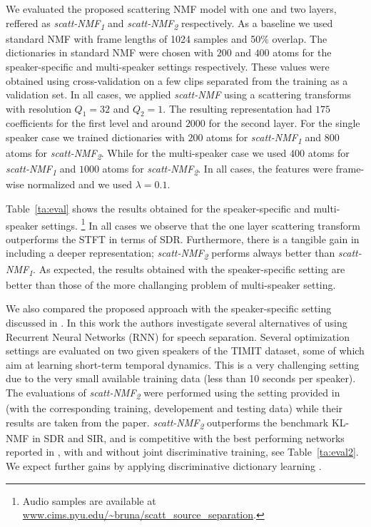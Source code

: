  We evaluated the proposed scattering NMF model with one and two layers, reffered
as \emph{scatt-NMF\textsubscript{1}} and \emph{scatt-NMF\textsubscript{2}} respectively. As a baseline we used standard NMF 
with frame lengths of 1024 samples and 50\% overlap. 
%
The dictionaries in standard NMF were chosen with $200$ and $400$ atoms for the speaker-specific and multi-speaker
settings respectively. These values were obtained using cross-validation on a few clips separated from the training as a validation set.
%
In all cases, we applied \emph{scatt-NMF} using a scattering transforms with resolution $Q_1= 32$ and $Q_2=1$.
The resulting representation had $175$ coefficients for the first level and around $2000$ for the second layer. 
%
For the single speaker case we trained dictionaries with $200$ atoms for \emph{scatt-NMF\textsubscript{1}}  and $800$ atoms for \emph{scatt-NMF\textsubscript{2}}.
While for the multi-speaker case we used $400$ atoms for \emph{scatt-NMF\textsubscript{1}}  and $1000$ atoms for \emph{scatt-NMF\textsubscript{2}}.
In all cases, the features were frame-wise normalized and we used $\lambda=0.1$. 
%
%

 Table~\ref{ta:eval} shows the results obtained for the speaker-specific and multi-speaker settings. \footnote{Audio samples are available at \url{www.cims.nyu.edu/~bruna/scatt_source_separation}.}
In all cases we observe that the one layer scattering transform outperforms the STFT in terms of SDR.
Furthermore, there is a tangible gain in including a deeper representation; \emph{scatt-NMF\textsubscript{2}} 
performs always better than \emph{scatt-NMF\textsubscript{1}}. 
As expected, the results obtained with the speaker-specific setting are better than those of the more challanging problem
of multi-speaker setting. 

We also compared the proposed approach with the speaker-specific setting discussed in \cite{Huang_DNN_Separation_ICASSP2014}. In this work
the authors investigate several alternatives of using Recurrent Neural Networks (RNN) for speech separation.
Several optimization settings are evaluated on two given speakers of the TIMIT dataset, some of which
aim at learning short-term temporal dynamics. This is a very challenging setting
due to the very small available training data (less than 10 seconds per speaker). The evaluations of \emph{scatt-NMF\textsubscript{2}} were performed using the setting provided in \cite{Huang_DNN_Separation_ICASSP2014} (with the corresponding training, developement and testing data) while their results are taken from the paper.
\emph{scatt-NMF\textsubscript{2}} outperforms the benchmark KL-NMF in SDR and SIR, and is competitive 
with the best performing networks
reported in \cite{Huang_DNN_Separation_ICASSP2014}, with and without joint discriminative training, see Table~\ref{ta:eval2}.
We expect further gains by applying discriminative dictionary learning \cite{sprechmann2014supervised}.

